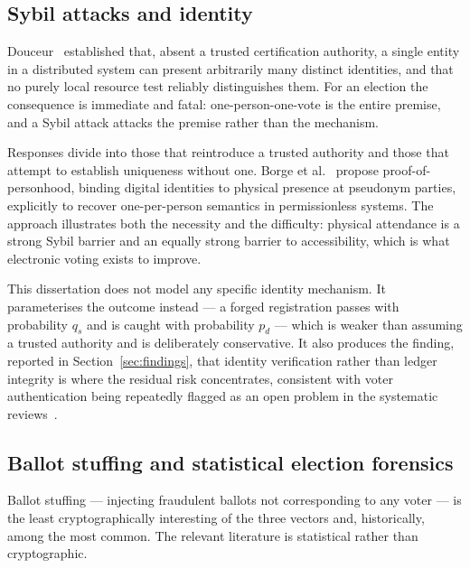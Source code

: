 \subsection{Sybil attacks and identity}
\label{sec:lit-sybil}

Douceur~\cite{douceur2002} established that, absent a trusted
certification authority, a single entity in a distributed system can
present arbitrarily many distinct identities, and that no purely local
resource test reliably distinguishes them. For an election the
consequence is immediate and fatal: one-person-one-vote is the entire
premise, and a Sybil attack attacks the premise rather than the
mechanism.

Responses divide into those that reintroduce a trusted authority and
those that attempt to establish uniqueness without one. Borge et
al.~\cite{borge2017} propose proof-of-personhood, binding digital
identities to physical presence at pseudonym parties, explicitly to
recover one-per-person semantics in permissionless systems. The
approach illustrates both the necessity and the difficulty: physical
attendance is a strong Sybil barrier and an equally strong barrier to
accessibility, which is what electronic voting exists to improve.

This dissertation does not model any specific identity mechanism. It
parameterises the outcome instead --- a forged registration passes with
probability $q_s$ and is caught with probability $p_d$ --- which is
weaker than assuming a trusted authority and is deliberately
conservative. It also produces the finding, reported in
Section~\ref{sec:findings}, that identity verification rather than
ledger integrity is where the residual risk concentrates, consistent
with voter authentication being repeatedly flagged as an open problem in
the systematic reviews~\cite{ohize2025,rahul2025}.

\subsection{Ballot stuffing and statistical election forensics}
\label{sec:lit-forensics}

Ballot stuffing --- injecting fraudulent ballots not corresponding to
any voter --- is the least cryptographically interesting of the three
vectors and, historically, among the most common. The relevant
literature is statistical rather than cryptographic.

